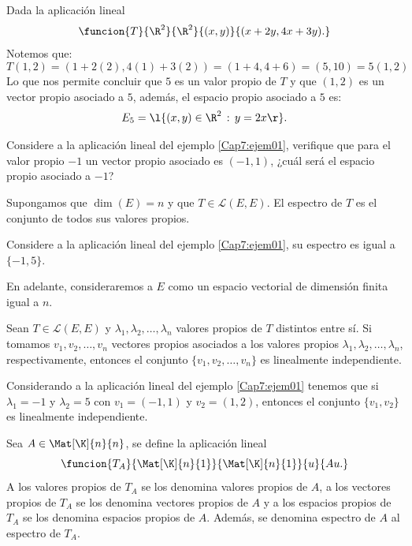 \documentclass[compacto,10pt]{pubciencias-notas}
\begin{document}
\begin{ejem}\hspace{0pt}\label{Cap7:ejem01} Dada la aplicación lineal
\[
    \funcion{T}{\R^2}{\R^2}{(x,y)}{(x+2y,4x+3y).}
\]
Notemos que:
\[
T(1,2) = (1 + 2(2), 4(1) + 3(2)) = (1+4, 4+6) = (5,10) = 5 (1,2)
\]
Lo que nos permite concluir que $5$ es un valor propio de $T$ y que $(1,2)$ es un vector propio asociado a $5$, además, el espacio propio asociado a $5$ es: 
\[
    E_5 = \l\{(x,y)\in\R^2\,:\,y=2x\r\}.
\]
\end{ejem}

\begin{ejer}\hspace{0pt} Considere a la aplicación lineal del ejemplo \ref{Cap7:ejem01}, verifique que para el valor propio $-1$ un vector propio asociado es $(-1,1)$, ¿cuál será el espacio propio asociado a $-1$?
\end{ejer}

\begin{defi}
Supongamos que $\dim(E) = n$ y que $T\in\mathscr{L}(E,E)$. El espectro de $T$ es el conjunto de todos sus valores propios.
\end{defi}

\begin{ejem}\hspace{0pt} Considere a la aplicación lineal del ejemplo \ref{Cap7:ejem01}, su espectro es igual a $\{-1,5\}$.
\end{ejem}

En adelante, consideraremos a $E$ como un espacio vectorial de dimensión finita igual a $n$.

\begin{teo}
Sean $T \in \mathscr{L}(E,E)$ y $\lambda_1, \lambda_2, \ldots, \lambda_n$ valores propios de $T$ distintos entre sí. Si tomamos $v_1, v_2, \ldots, v_n$ vectores propios asociados a los valores propios $\lambda_1, \lambda_2, \ldots, \lambda_n$, respectivamente, entonces el conjunto $\{v_1, v_2, \ldots, v_n\}$ es linealmente independiente.
\end{teo}

\begin{ejem}\hspace{0pt} Considerando a la aplicación lineal del ejemplo \ref{Cap7:ejem01} tenemos que si $\lambda_{1} = -1$ y $\lambda_{2} = 5$ con $v_{1} = (-1,1)$ y $v_{2} = (1,2)$, entonces el conjunto $\{v_{1}, v_{2}\}$ es linealmente independiente.
\end{ejem}

\begin{defi}
Sea $A\in \Mat[\K]{n}{n}$,
se define la aplicación lineal
\[
    \funcion{T_A}{\Mat[\K]{n}{1}}{\Mat[\K]{n}{1}}{u}{Au.}
\]
A los valores propios de $T_A$ se los denomina valores propios de $A$, a los vectores propios de $T_A$ se los denomina vectores propios de $A$ y a los espacios propios de $T_A$ se los denomina espacios propios de $A$. Además, se denomina espectro de $A$ al espectro de $T_A$.
\end{defi}
\end{document}
